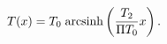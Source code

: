 \begin{equation}\label{exs}
T(x)=T_{0}\;{\rm arcsinh}\left(\frac{T_{2}}{\Pi T_{0}}x\right).
\end{equation}

